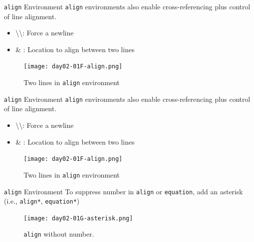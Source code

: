 \documentclass{beamer}
\begin{document}
{  \begin{frame}{\texttt{align} Environment}
    \texttt{align} environments also enable cross-referencing plus control of line alignment.
    \begin{itemize}
      \item \textbackslash\textbackslash : Force a newline
      \item \& : Location to align between two lines
    \end{itemize}
    \begin{figure}
      \texttt{[image: day02-01F-align.png]}
      \caption{Two lines in \texttt{align} environment}
      \label{fig:day02-01F}
    \end{figure}
  \end{frame}

  \begin{frame}{\texttt{align} Environment}
    \texttt{align} environments also enable cross-referencing plus control of line alignment.
    \begin{itemize}
      \item \textbackslash\textbackslash : Force a newline
      \item \& : Location to align between two lines
    \end{itemize}
    \begin{figure}
      \texttt{[image: day02-01F-align.png]}
      \caption{Two lines in \texttt{align} environment}
      \label{fig:day02-01F}
    \end{figure}
  \end{frame}

  \begin{frame}{\texttt{align} Environment}
    To suppress number in \texttt{align} or \texttt{equation}, add an asterisk (i.e., \texttt{align*}, \texttt{equation*})
    \begin{figure}
      \texttt{[image: day02-01G-asterisk.png]}
      \caption{\texttt{align} without number.}
      \label{fig:day02-01G}
    \end{figure}
  \end{frame}


}
\end{document}

